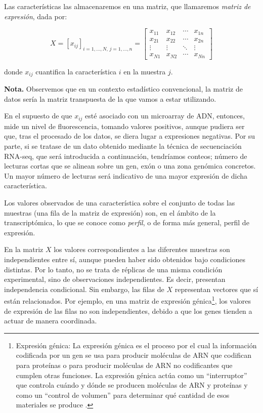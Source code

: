 Las características las almacenaremos en una matriz, que llamaremos \textit{matriz de expresión}, dada por:

\[
X = [x_{ij}]_{i=1,\dots,N,\, j=1,\dots,n} =
\begin{bmatrix}
x_{11} & x_{12} & \cdots & x_{1n} \\
x_{21} & x_{22} & \cdots & x_{2n} \\
\vdots & \vdots & \ddots & \vdots \\
x_{N1} & x_{N2} & \cdots & x_{Nn}
\end{bmatrix}
\]


donde $x_{ij}$ cuantifica la característica $i$ en la muestra $j$. \newline

\textbf{Nota.} Observemos que en un contexto estadístico
convencional, la matriz de datos sería la matriz transpuesta de la que vamos a estar utilizando. \newline

En el supuesto de que $x_{ij}$ esté asociado con un microarray de ADN, entonces, mide un nivel de fluorescencia,
tomando valores positivos, aunque pudiera ser que, tras el procesado de los datos, se diera lugar a expresiones 
negativas. Por su parte, si se tratase de un dato obtenido mediante la técnica de secuenciación RNA-seq, que será introducida a continuación, tendríamos conteos; 
número de lecturas cortas que se alinean sobre un gen, exón o una zona genómica concretos. Un mayor número de
lecturas será indicativo de una mayor expresión de dicha característica. \newline

Los valores observados de una característica sobre el conjunto de todas las muestras (una fila de la matriz de
expresión) son, en el ámbito de la transcriptómica, lo que se conoce como \textit{perfil}, o de forma más general,
perfil de expresión. \newline

En la matriz $X$ los valores correspondientes a las diferentes muestras son independientes entre sí, aunque pueden
haber sido obtenidos bajo condiciones distintas. Por lo tanto, no se trata de réplicas de una misma condición
experimental, sino de observaciones independientes. Es decir, presentan independencia condicional. Sin embargo, las
filas de $X$ representan vectores que sí están relacionados. Por ejemplo, en una matriz de expresión génica\footnote[5]{Expresión génica: 
La expresión génica es el proceso por el cual la información codificada por un gen se usa 
para producir moléculas de ARN que codifican para proteínas o para producir moléculas de ARN no codificantes que cumplen otras funciones. La expresión génica
actúa como un “interruptor” que controla cuándo y dónde se producen moléculas de ARN y proteínas y como un “control de volumen” para determinar qué cantidad
de esos materiales se produce \cite{expresion-genica-definition}.}, los 
valores de expresión de las filas no son independientes, debido a que los genes tienden a actuar de manera coordinada. \newline

